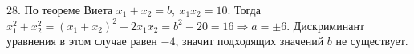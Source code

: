 28. По теореме Виета $x_1+x_2=b,\ x_1x_2=10.$ Тогда $x_1^2+x_2^2=(x_1+x_2)^2-2x_1x_2=b^2-20=16\Rightarrow a=\pm6.$ Дискриминант уравнения в этом случае равен $-4$, значит подходящих значений $b$ не существует.\\
